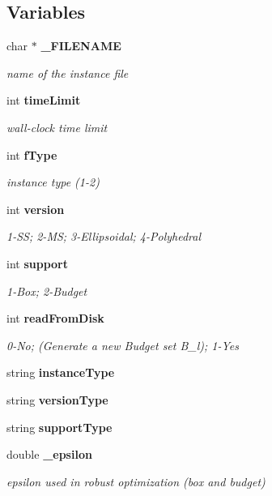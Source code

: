 \subsection*{Variables}
\begin{DoxyCompactItemize}
\item 
char $\ast$ \textbf{ \+\_\+\+F\+I\+L\+E\+N\+A\+ME}
\begin{DoxyCompactList}\small\item\em name of the instance file \end{DoxyCompactList}\item 
int \textbf{ time\+Limit}
\begin{DoxyCompactList}\small\item\em wall-\/clock time limit \end{DoxyCompactList}\item 
int \textbf{ f\+Type}
\begin{DoxyCompactList}\small\item\em instance type (1-\/2) \end{DoxyCompactList}\item 
int \textbf{ version}
\begin{DoxyCompactList}\small\item\em 1-\/\+SS; 2-\/\+MS; 3-\/\+Ellipsoidal; 4-\/\+Polyhedral \end{DoxyCompactList}\item 
int \textbf{ support}
\begin{DoxyCompactList}\small\item\em 1-\/\+Box; 2-\/\+Budget \end{DoxyCompactList}\item 
int \textbf{ read\+From\+Disk}
\begin{DoxyCompactList}\small\item\em 0-\/\+No; (Generate a new Budget set B\+\_\+l); 1-\/\+Yes \end{DoxyCompactList}\item 
string \textbf{ instance\+Type}
\item 
string \textbf{ version\+Type}
\item 
string \textbf{ support\+Type}
\item 
double \textbf{ \+\_\+epsilon}
\begin{DoxyCompactList}\small\item\em epsilon used in robust optimization (box and budget) \end{DoxyCompactList}\end{DoxyCompactItemize}


